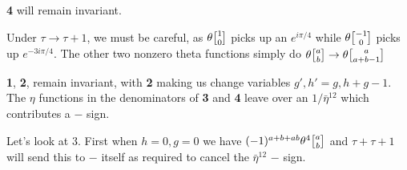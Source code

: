 \documentclass[11pt, class=article, crop=false]{standalone}
\begin{document}
\begin{enumerate}
	\textbf{4} will remain invariant. 
		
	Under $\tau \to \tau + 1$, we must be careful, as $\theta\twist10$ picks up an $e^{i \pi /4}$ while $\theta \twist{-1}{0}$ picks up $e^{-3 i \pi /4}$. The other two nonzero theta functions simply do $\theta \twist{a}{b} \to \theta \twist{a}{a+b-1}$
	
	\textbf{1}, \textbf{2}, remain invariant, with \textbf{2} making us change variables $g',h' = g, h+g-1$. The $\eta$ functions in the denominators of \textbf{3} and \textbf{4} leave over an $1/\bar \eta^{12}$ which contributes a $-$ sign. 
	
	Let's look at $3$. First when $h=0,g=0$ we have $(-1)^{a+b+ab} \theta^4 \twist ab$ and $\tau + \tau +1$ will send this to $-$ itself as required to cancel the $\bar \eta^{12}$ $-$ sign. 
	

\end{enumerate}
\end{document}

